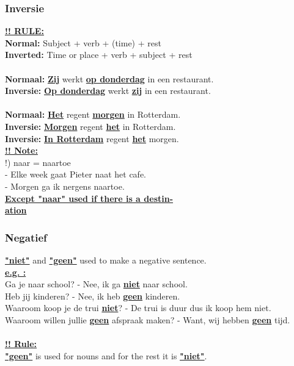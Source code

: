 \documentclass[a4paper,14pt]{extarticle}
\newcommand{\attention}[1]{\underline{\textbf{!! #1}}}
\newcommand{\emp}[1]{\underline{\textbf{#1}}}
\begin{document}
\subsubsection{Inversie}
\begin{paracol}{2}
\attention{RULE:} \\
\textbf{Normal:} Subject + verb + (time) + rest  \\
\textbf{Inverted:} Time or place + verb + subject + rest  \\
\\
\textbf{Normaal:} \emp{Zij} werkt \emp{op donderdag} in een restaurant. \\
\textbf{Inversie:} \emp{Op donderdag} werkt \emp{zij} in een restaurant. \\
\\
\textbf{Normaal:} \emp{Het} regent \emp{morgen} in Rotterdam. \\
\textbf{Inversie:} \emp{Morgen} regent \emp{het} in Rotterdam. \\
\textbf{Inversie:} \emp{In Rotterdam} regent \emp{het} morgen. \\
\switchcolumn
\attention{Note:} \\
!) naar = naartoe \\
- Elke week gaat Pieter naat het cafe. \\
- Morgen ga ik nergens naartoe. \\
\emp{Except "naar" used if there is a destin-} \\
\emp{ation} \\
\end{paracol}
\subsubsection{Negatief}
\emp{"niet"} and \emp{"geen"} used to make a negative sentence. \\
\emp{e.g. :} \\
Ga je naar school? - Nee, ik ga \emp{niet} naar school. \\
Heb jij kinderen? - Nee, ik heb \emp{geen} kinderen. \\
Waaroom koop je de trui \emp{niet}? - De trui is duur dus ik koop hem {niet}. \\
Waaroom willen jullie \emp{geen} afspraak maken? - Want, wij hebben \emp{geen} tijd. \\
\\
\attention{Rule:} \\
\emp{"geen"} is used for nouns and for the rest it is \emp{"niet"}.
\end{document}
